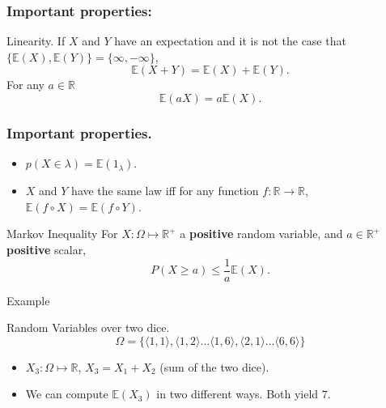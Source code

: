 \documentclass{beamer}
\begin{document}
\begin{frame}
  \frametitle{Important properties:}
  \begin{block}{Linearity.}
    If $X$ and $Y$ have an expectation and it is not the case that $\{\mathbb{E}(X), \mathbb{E}(Y)\} = \{\infty, {-}\infty\}$,
    \[ \mathbb{E}(X + Y) = \mathbb{E}(X) + \mathbb{E}(Y). \]
    For any $a \in \mathbb{R}$
    \[\mathbb{E}(aX) = a\mathbb{E}(X).\]
  \end{block}
\end{frame}

\begin{frame}
  \frametitle{Important properties.}
  \begin{itemize}
  \item $p(X \in \lambda) = \mathbb{E}(1_{\lambda})$.
  \item $X$ and $Y$ have the same law iff for any function $f: \mathbb{R} \rightarrow \mathbb{R}$, $\mathbb{E}(f \circ X) = \mathbb{E}(f \circ Y)$.
  \end{itemize}

  \begin{block}{Markov Inequality}
      For $X: \Omega \mapsto \mathbb{R}^{+}$ a {\bf positive} random variable, and $a \in \mathbb{R}^{+}$ {\bf positive} scalar,
      \[P(X \ge a) \le \frac{1}{a}\mathbb{E}(X).\]
  \end{block}
  
\end{frame}

\begin{frame}{Example}
  \begin{exampleblock}{Random Variables over two dice.}
    \[\Omega = \{\langle 1,1 \rangle, \langle 1,2 \rangle \dots \langle 1,6 \rangle, \langle 2,1 \rangle \dots \langle 6,6 \rangle\}\]
    \begin{itemize}
    \item $X_3: \Omega \mapsto \mathbb{R}$, $X_3 = X_1 + X_2$ (sum of the two dice).
    \item We can compute $\mathbb{E}(X_3)$ in two different ways. Both yield $7$.
    \end{itemize}
  \end{exampleblock}
\end{frame}
\end{document}
